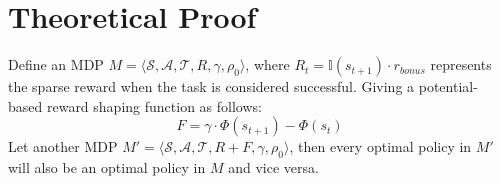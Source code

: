 \section{Theoretical Proof}\label{app:proofs}
\begin{theorem}\label{thm:policy-invariance-proof}
Define an MDP \( M = \langle \mathcal{S}, \mathcal{A}, \mathcal{T}, R, \gamma, \rho_0 \rangle \), where $R_t = \mathbb{I}(s_{t+1})\cdot r_{bonus}$ represents the sparse reward when the task is considered successful.
Giving a potential-based reward shaping function as follows:
\begin{equation*}
    F =  \gamma \cdot \Phi(s_{t+1}) - \Phi(s_{t})
\end{equation*}
Let another MDP \( M' = \langle \mathcal{S}, \mathcal{A}, \mathcal{T}, R+F, \gamma, \rho_0 \rangle \), then every optimal policy in $M'$ will also be an optimal policy in $M$ and vice versa.
\end{theorem}

